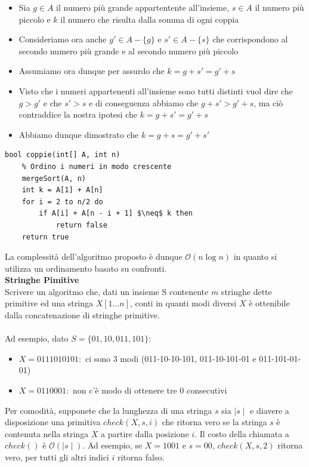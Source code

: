 \documentclass[../cheatSheetAlgoritmi.tex]{subfiles}
\begin{document}
\begin{itemize}
	\item Sia $g \in A$ il numero più grande appartentente all'insieme, $s \in A$ il numero più piccolo e $k$ il numero che risulta dalla somma di ogni coppia
	\item Consideriamo ora anche $g' \in A - \{g\}$ e $s' \in A - \{s\}$ che corrispondono al secondo numero più grande e al secondo numero più piccolo
	\item Assumiamo ora dunque per assurdo che $k = g + s' = g' + s$
	\item Visto che i numeri appartenenti all'insieme sono tutti distinti vuol dire che $g > g'$ e che $s' > s$ e di conseguenza abbiamo che $g + s' > g' + s$, ma ciò contraddice la nostra ipotesi che $k = g + s' = g' + s$
	\item Abbiamo dunque dimostrato che $k = g + s = g' + s'$ 
\end{itemize}
\begin{lstlisting}[caption=2-partition (Coppie)]
bool coppie(int[] A, int n)
	% Ordino i numeri in modo crescente
	mergeSort(A, n)
	int k = A[1] + A[n]
	for i = 2 to n/2 do
		if A[i] + A[n - i + 1] $\neq$ k then
			return false
	return true
\end{lstlisting}
La complessità dell'algoritmo proposto è dunque $\mathcal{O}(n \log n)$ in quanto si utilizza un ordinamento basato su confronti.\\
\textbf{Stringhe Pimitive}\\
Scrivere un algoritmo che, dati un insieme S contenente $m$ stringhe dette primitive ed una stringa $X[1. . . n]$, conti in quanti modi diversi $X$ è ottenibile dalla concatenazione di stringhe primitive. \\\\
Ad esempio, dato $S=\{01,10,011,101\}$:
\begin{itemize}
	\item $X = 0111010101: $ ci sono 3 modi
(011-10-10-101, 011-10-101-01 e 011-101-01-01)
	\item $X = 0110001:$ non c’è modo di ottenere tre $0$ consecutivi
\end{itemize}
Per comodità, supponete che la lunghezza di una stringa $s$ sia $\mid s \mid$ e diavere a disposizione una primitiva $check(X, s, i)$ che ritorna vero se la stringa $s$ è contenuta nella stringa $X$ a partire dalla posizione $i$. Il costo della chiamata a $check()$ è $\mathcal{O}(\mid s \mid)$. Ad esempio, se $X=1001$ e $s=00$, $check(X, s,2)$ ritorna vero, per tutti gli altri indici $i$ ritorna falso.
\end{document}
